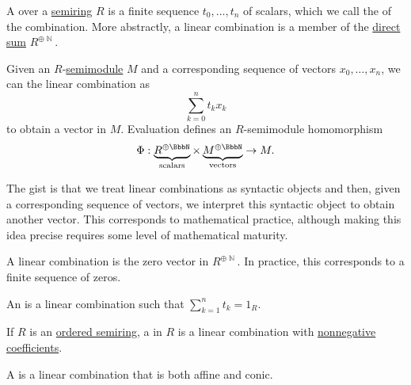 \begin{definition}\label{def:linear_combination}\mimprovised
  A  over a \hyperref[def:semiring]{semiring} \( R \) is a finite sequence \( t_0, \ldots, t_n \) of scalars, which we call the  of the combination. More abstractly, a linear combination is a member of the \hyperref[def:semimodule_direct_product]{direct sum} \( R^{\oplus \BbbN} \).

  Given an \( R \)-\hyperref[def:semimodule]{semimodule} \( M \) and a corresponding sequence of vectors \( x_0, \ldots, x_n \), we can  the linear combination as
  \begin{equation}
    \sum_{k=0}^n t_k x_k
  \end{equation}
  to obtain a vector in \( M \). Evaluation defines an \( R \)-semimodule homomorphism
  \begin{equation*}
    \Phi: \underbrace{R^{\oplus \BbbN}}_{\T{scalars}} \times \underbrace{M^{\oplus \BbbN}}_{\T{vectors}} \to M.
  \end{equation*}

  The gist is that we treat linear combinations as syntactic objects and then, given a corresponding sequence of vectors, we interpret this syntactic object to obtain another vector. This corresponds to mathematical practice, although making this idea precise requires some level of mathematical maturity.

  \begin{thmenum}
     A  linear combination is the zero vector in \( R^{\oplus \BbbN} \). In practice, this corresponds to a finite sequence of zeros.

     An  is a linear combination such that \( \sum_{k=1}^n t_k = 1_R \).

     If \( R \) is an \hyperref[def:ordered_semiring]{ordered semiring}, a  in \( R \) is a linear combination with \hyperref[def:ordered_semiring]{nonnegative coefficients}.

     A  is a linear combination that is both affine and conic.
  \end{thmenum}
\end{definition}

